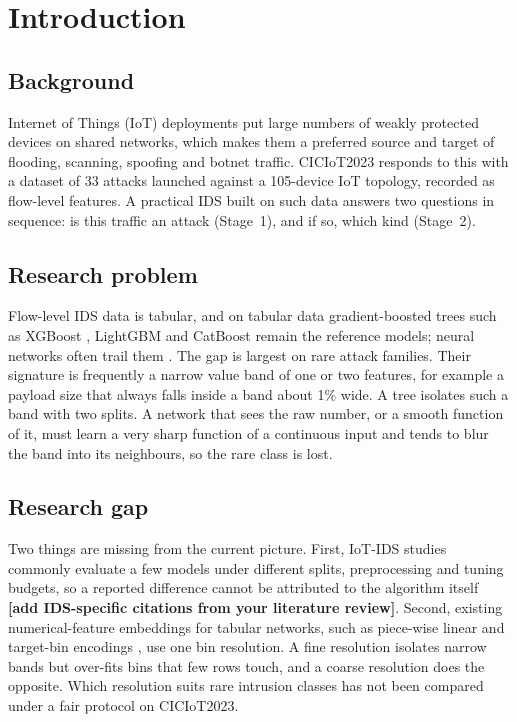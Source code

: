 \documentclass[11pt,a4paper]{article}
\begin{document}
\section{Introduction}

\subsection{Background}
Internet of Things (IoT) deployments put large numbers of weakly protected devices on shared networks, which makes them a preferred source and target of flooding, scanning, spoofing and botnet traffic. CICIoT2023 \cite{neto2023ciciot} responds to this with a dataset of 33 attacks launched against a 105-device IoT topology, recorded as flow-level features. A practical IDS built on such data answers two questions in sequence: is this traffic an attack (Stage~1), and if so, which kind (Stage~2).

\subsection{Research problem}
Flow-level IDS data is tabular, and on tabular data gradient-boosted trees such as XGBoost \cite{chen2016xgboost}, LightGBM \cite{ke2017lightgbm} and CatBoost \cite{prokhorenkova2018catboost} remain the reference models; neural networks often trail them \cite{grinsztajn2022trees,shwartz2022tabular}. The gap is largest on rare attack families. Their signature is frequently a narrow value band of one or two features, for example a payload size that always falls inside a band about 1\% wide. A tree isolates such a band with two splits. A network that sees the raw number, or a smooth function of it, must learn a very sharp function of a continuous input and tends to blur the band into its neighbours, so the rare class is lost.

\subsection{Research gap}
Two things are missing from the current picture. First, IoT-IDS studies commonly evaluate a few models under different splits, preprocessing and tuning budgets, so a reported difference cannot be attributed to the algorithm itself \textbf{[add IDS-specific citations from your literature review]}. Second, existing numerical-feature embeddings for tabular networks, such as piece-wise linear and target-bin encodings \cite{gorishniy2022embeddings}, use one bin resolution. A fine resolution isolates narrow bands but over-fits bins that few rows touch, and a coarse resolution does the opposite. Which resolution suits rare intrusion classes has not been compared under a fair protocol on CICIoT2023.
\end{document}
